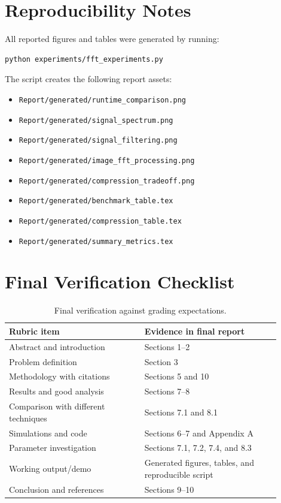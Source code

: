 \documentclass{zc-ust-hw}
\begin{document}
\section{Reproducibility Notes}
All reported figures and tables were generated by running:
\begin{lstlisting}
python experiments/fft_experiments.py
\end{lstlisting}
The script creates the following report assets:
\begin{itemize}
    \item \texttt{Report/generated/runtime\_comparison.png}
    \item \texttt{Report/generated/signal\_spectrum.png}
    \item \texttt{Report/generated/signal\_filtering.png}
    \item \texttt{Report/generated/image\_fft\_processing.png}
    \item \texttt{Report/generated/compression\_tradeoff.png}
    \item \texttt{Report/generated/benchmark\_table.tex}
    \item \texttt{Report/generated/compression\_table.tex}
    \item \texttt{Report/generated/summary\_metrics.tex}
\end{itemize}

\section{Final Verification Checklist}
\begin{table}[H]
\centering
\caption{Final verification against grading expectations.}
\begin{tabular}{p{0.45\linewidth}p{0.45\linewidth}}
\toprule
\textbf{Rubric item} & \textbf{Evidence in final report} \\
\midrule
Abstract and introduction & Sections 1--2 \\
Problem definition & Section 3 \\
Methodology with citations & Sections 5 and 10 \\
Results and good analysis & Sections 7--8 \\
Comparison with different techniques & Sections 7.1 and 8.1 \\
Simulations and code & Sections 6--7 and Appendix A \\
Parameter investigation & Sections 7.1, 7.2, 7.4, and 8.3 \\
Working output/demo & Generated figures, tables, and reproducible script \\
Conclusion and references & Sections 9--10 \\
\bottomrule
\end{tabular}
\end{table}
\end{document}
